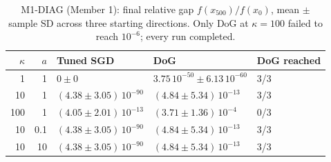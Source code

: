 \begin{table}[H]\centering\footnotesize
\caption{M1-DIAG (Member 1): final relative gap $f(x_{500})/f(x_0)$, mean $\pm$ sample SD across three starting directions. Only DoG at $\kappa=100$ failed to reach $10^{-6}$; every run completed.}
\label{tab:m1-diag}
\begin{tabular}{rrlll}\toprule
$\kappa$ & $a$ & Tuned SGD & DoG & DoG reached\\\midrule
1 & 1 & $0\pm0$ & $3.75\,10^{-50}\pm 6.13\,10^{-60}$ & 3/3\\
10 & 1 & $(4.38\pm3.05)\,10^{-90}$ & $(4.84\pm5.34)\,10^{-13}$ & 3/3\\
100 & 1 & $(4.05\pm2.01)\,10^{-13}$ & $(3.71\pm1.36)\,10^{-4}$ & 0/3\\
10 & 0.1 & $(4.38\pm3.05)\,10^{-90}$ & $(4.84\pm5.34)\,10^{-13}$ & 3/3\\
10 & 10 & $(4.38\pm3.05)\,10^{-90}$ & $(4.84\pm5.34)\,10^{-13}$ & 3/3\\
\bottomrule\end{tabular}\end{table}
